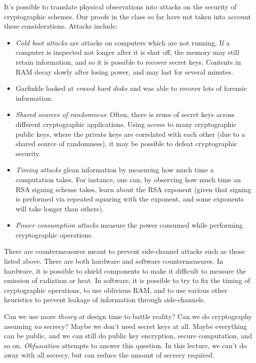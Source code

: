 \documentclass[10pt]{article}
\begin{document}
It's possible to translate physical observations into attacks on the security of cryptographic schemes. Our proofs in the class so far have not taken into account these considerations. Attacks include:

\begin{itemize}
\item \emph{Cold boot attacks} are attacks on computers which are not running. If a computer is inspected not longer after it is shut off, the memory may still retain information, and so it is possible to recover secret keys. Contents in RAM decay slowly after losing power, and may last for several minutes.
\item Garfinkle \cite{garfinkel2003} looked at \emph{erased hard disks} and was able to recover lots of forensic information.
\item \emph{Shared sources of randomness}: Often, there is reuse of secret keys across different cryptographic applications. Using access to many cryptographic public keys, where the private keys are correlated with each other (due to a shared source of randomness), it may be possible to defeat cryptographic security.
\item \emph{Timing attacks} glean information by measuring how much time a computation takes. For instance, one can, by observing how much time an RSA signing scheme takes, learn about the RSA exponent (given that signing is performed via repeated squaring with the exponent, and some exponents will take longer than others).
\item \emph{Power consumption attacks} measure the power consumed while performing cryptographic operations.
\end{itemize}

There are countermeasures meant to prevent side-channel attacks such as those listed above. There are both hardware and software countermeasures. In hardware, it is possible to shield components to make it difficult to measure the emission of radiation or heat. In software, it is possible to try to fix the timing of cryptographic operations, to use oblivious RAM, and to use various other heuristics to prevent leakage of information through side-channels.

Can we use more \emph{theory} at design time to battle reality? Can we do cryptography assuming \emph{no} secrecy? Maybe we don't need secret keys at all. Maybe everything can be public, and we can still do public key encryption, secure computation, and so on. \emph{Obfuscation} attempts to answer this question. In this lecture, we can't do away with all secrecy, but can reduce the amount of secrecy required.
\end{document}
